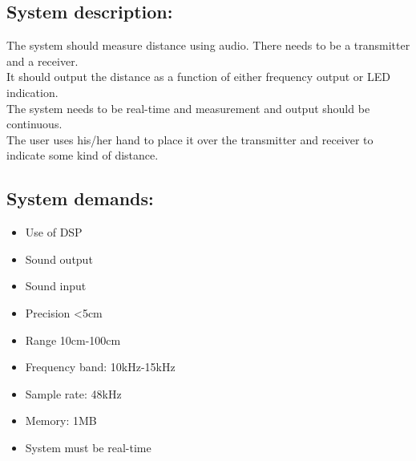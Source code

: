 \subsection{System description:}
The system should measure distance using audio. There needs to be a transmitter and a receiver.\\
It should output the distance as a function of either frequency output or LED indication.\\
The system needs to be real-time and measurement and output should be continuous.\\
The user uses his/her hand to place it over the transmitter and receiver to indicate some kind of distance.\\
\subsection{System demands:}
\begin{itemize}
\item Use of DSP
\item Sound output
\item Sound input
\item Precision <5cm
\item Range 10cm-100cm
\item Frequency band: 10kHz-15kHz
\item Sample rate: 48kHz
\item Memory: 1MB
\item System must be real-time
\end{itemize}


